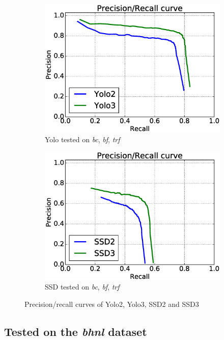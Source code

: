 \begin{figure}[h!]
\begin{subfigure}{.5\textwidth}
  \centering
  \includegraphics[width=0.8\linewidth]{results/case_buildings/prec_recall/yolo/bcbftrf.eps}
  \caption{Yolo tested on \textit{bc}, \textit{bf}, \textit{trf}}
  \label{fig:sfig1}
\end{subfigure}%
\begin{subfigure}{.5\textwidth}
  \centering
  \includegraphics[width=.8\linewidth]{results/case_buildings/prec_recall/ssd/bcbftrf.eps}
  \caption{SSD tested on \textit{bc}, \textit{bf}, \textit{trf}}
  \label{fig:sfig2}
\end{subfigure}
\caption{Precision/recall curves of Yolo2, Yolo3, SSD2 and SSD3}
\label{fig:case_build}
\end{figure}

\newpage


\subsection{Tested on the \textit{bhnl} dataset}

